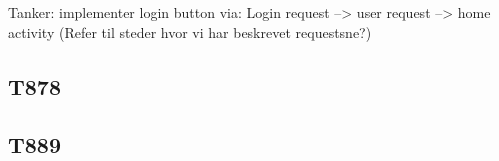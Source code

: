 Tanker:
implementer login button via:
Login request --> user request --> home activity
(Refer til steder hvor vi har beskrevet requestsne?)


\subsection{T878}

\subsection{T889}


